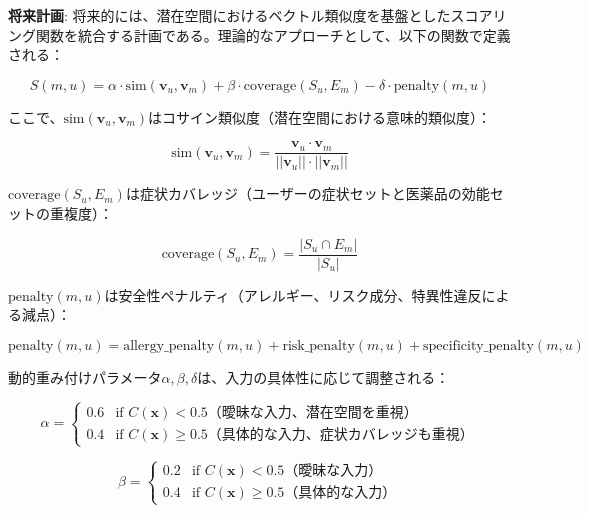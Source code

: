 \documentclass[a4paper,11pt,ja=standard,xelatex]{bxjsarticle}
\theoremstyle{definition}
\begin{document}
\textbf{将来計画}: 将来的には、潜在空間におけるベクトル類似度を基盤としたスコアリング関数を統合する計画である。理論的なアプローチとして、以下の関数で定義される：

\begin{equation}
S(m, u) = \alpha \cdot \text{sim}(\mathbf{v}_u, \mathbf{v}_m) + \beta \cdot \text{coverage}(S_u, E_m) - \delta \cdot \text{penalty}(m, u)
\end{equation}

ここで、$\text{sim}(\mathbf{v}_u, \mathbf{v}_m)$はコサイン類似度（潜在空間における意味的類似度）：

\begin{equation}
\text{sim}(\mathbf{v}_u, \mathbf{v}_m) = \frac{\mathbf{v}_u \cdot \mathbf{v}_m}{||\mathbf{v}_u|| \cdot ||\mathbf{v}_m||}
\end{equation}

$\text{coverage}(S_u, E_m)$は症状カバレッジ（ユーザーの症状セットと医薬品の効能セットの重複度）：

\begin{equation}
\text{coverage}(S_u, E_m) = \frac{|S_u \cap E_m|}{|S_u|}
\end{equation}

$\text{penalty}(m, u)$は安全性ペナルティ（アレルギー、リスク成分、特異性違反による減点）：

\begin{equation}
\text{penalty}(m, u) = \text{allergy\_penalty}(m, u) + \text{risk\_penalty}(m, u) + \text{specificity\_penalty}(m, u)
\end{equation}

動的重み付けパラメータ$\alpha, \beta, \delta$は、入力の具体性に応じて調整される：

\begin{equation}
\alpha = \begin{cases}
0.6 & \text{if } C(\mathbf{x}) < 0.5 \text{（曖昧な入力、潜在空間を重視）} \\
0.4 & \text{if } C(\mathbf{x}) \geq 0.5 \text{（具体的な入力、症状カバレッジも重視）}
\end{cases}
\end{equation}

\begin{equation}
\beta = \begin{cases}
0.2 & \text{if } C(\mathbf{x}) < 0.5 \text{（曖昧な入力）} \\
0.4 & \text{if } C(\mathbf{x}) \geq 0.5 \text{（具体的な入力）}
\end{cases}
\end{equation}
\end{document}
